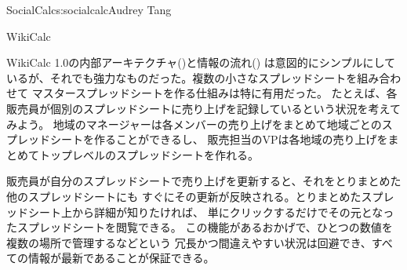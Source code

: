 \begin{aosachapter}{SocialCalc}{s:socialcalc}{Audrey Tang}
\begin{aosasect1}{WikiCalc}
\begin{aosaitemize}
\end{aosaitemize}




WikiCalc 1.0の内部アーキテクチャ()と情報の流れ()
は意図的にシンプルにしているが、それでも強力なものだった。複数の小さなスプレッドシートを組み合わせて
マスタースプレッドシートを作る仕組みは特に有用だった。
たとえば、各販売員が個別のスプレッドシートに売り上げを記録しているという状況を考えてみよう。
地域のマネージャーは各メンバーの売り上げをまとめて地域ごとのスプレッドシートを作ることができるし、
販売担当のVPは各地域の売り上げをまとめてトップレベルのスプレッドシートを作れる。

販売員が自分のスプレッドシートで売り上げを更新すると、それをとりまとめた他のスプレッドシートにも
すぐにその更新が反映される。とりまとめたスプレッドシート上から詳細が知りたければ、
単にクリックするだけでその元となったスプレッドシートを閲覧できる。
この機能があるおかげで、ひとつの数値を複数の場所で管理するなどという
冗長かつ間違えやすい状況は回避でき、すべての情報が最新であることが保証できる。


\end{aosasect1}
\end{aosachapter}
